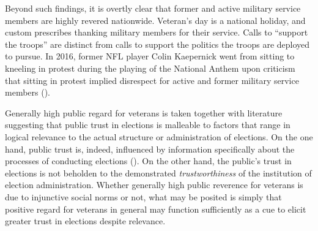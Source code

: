 \documentclass[
  12pt,
  letterpaper,
]{article}
\begin{document}
Beyond such findings, it is overtly clear that former and active
military service members are highly revered nationwide. Veteran's day is
a national holiday, and custom prescribes thanking military members for
their service. Calls to ``support the troops'' are distinct from calls
to support the politics the troops are deployed to pursue. In 2016,
former NFL player Colin Kaepernick went from sitting to kneeling in
protest during the playing of the National Anthem upon criticism that
sitting in protest implied disrespect for active and former military
service members ().

Generally high public regard for veterans is taken together with
literature suggesting that public trust in elections is malleable to
factors that range in logical relevance to the actual structure or
administration of elections. On the one hand, public trust is, indeed,
influenced by information specifically about the processes of conducting
elections (). On the
other hand, the public's trust in elections is not beholden to the
demonstrated \emph{trustworthiness} of the institution of election
administration. Whether generally high public reverence for veterans is
due to injunctive social norms or not, what may be posited is simply
that positive regard for veterans in general may function sufficiently
as a cue to elicit greater trust in elections despite relevance.
\end{document}
